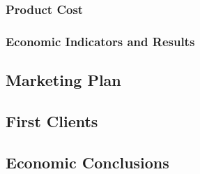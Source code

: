 \subsubsection{Product Cost}

\subsubsection{Economic Indicators and Results}

\subsection{Marketing Plan}

\subsection{First Clients}

\subsection{Economic Conclusions}






\clearpage
